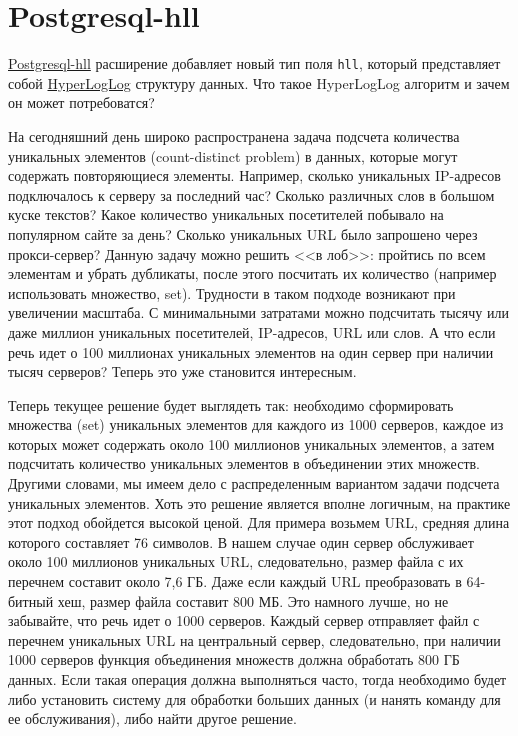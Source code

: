 \section{Postgresql-hll}

\href{https://github.com/aggregateknowledge/postgresql-hll}{Postgresql-hll} расширение добавляет новый тип поля \lstinline!hll!, который представляет собой \href{https://en.wikipedia.org/wiki/HyperLogLog}{HyperLogLog} структуру данных. Что такое HyperLogLog алгоритм и зачем он может потребоватся?

На сегодняшний день широко распространена задача подсчета количества уникальных элементов (count-distinct problem) в данных, которые могут содержать повторяющиеся элементы. Например, сколько уникальных IP-адресов подключалось к серверу за последний час? Сколько различных слов в большом куске текстов? Какое количество уникальных посетителей побывало на популярном сайте за день? Сколько уникальных URL было запрошено через прокси-сервер? Данную задачу можно решить <<в лоб>>: пройтись по всем элементам и убрать дубликаты, после этого посчитать их количество (например использовать множество, set). Трудности в таком подходе возникают при увеличении масштаба. С минимальными затратами можно подсчитать тысячу или даже миллион уникальных посетителей, IP-адресов, URL или слов. А что если речь идет о 100 миллионах уникальных элементов на один сервер при наличии тысяч серверов? Теперь это уже становится интересным.

Теперь текущее решение будет выглядеть так: необходимо сформировать множества (set) уникальных элементов для каждого из 1000 серверов, каждое из которых может содержать около 100 миллионов уникальных элементов, а затем подсчитать количество уникальных элементов в объединении этих множеств. Другими словами, мы имеем дело с распределенным вариантом задачи подсчета уникальных элементов. Хоть это решение является вполне логичным, на практике этот подход обойдется высокой ценой. Для примера возьмем URL, средняя длина которого составляет 76 символов. В нашем случае один сервер обслуживает около 100 миллионов уникальных URL, следовательно, размер файла с их перечнем составит около 7,6 ГБ. Даже если каждый URL преобразовать в 64-битный хеш, размер файла составит 800 МБ. Это намного лучше, но не забывайте, что речь идет о 1000 серверов. Каждый сервер отправляет файл с перечнем уникальных URL на центральный сервер, следовательно, при наличии 1000 серверов функция объединения множеств должна обработать 800 ГБ данных. Если такая операция должна выполняться часто, тогда необходимо будет либо установить систему для обработки больших данных (и нанять команду для ее обслуживания), либо найти другое решение.

